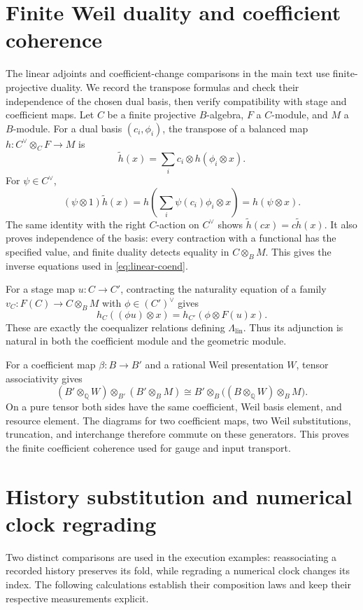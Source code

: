 \documentclass[11pt,a4paper]{article}
\numberwithin{algorithm}{section}
\numberwithin{equation}{section}
\theoremstyle{definition}
\theoremstyle{remark}
\theoremstyle{plain}
\newcommand{\QQ}{\mathbb Q}
\newcommand{\Lamlin}{\Lambda_{\mathrm{lin}}}
\theoremstyle{definition}
\theoremstyle{plain}
\begin{document}
\section{Finite Weil duality and coefficient coherence}
\label{app:weil}

The linear adjoints and coefficient-change comparisons in the
main text use finite-projective duality. We record the transpose
formulas and check their independence of the chosen dual basis,
then verify compatibility with stage and coefficient maps.
Let $C$ be a finite projective $B$-algebra, $F$ a $C$-module,
and $M$ a $B$-module. For a dual basis $(c_i,\phi_i)$,
the transpose of a balanced map
$h:C^\vee\otimes_CF\to M$ is
\[
 \widetilde h(x)=\sum_i c_i\otimes h(\phi_i\otimes x).
\]
For $\psi\in C^\vee$,
\[
 (\psi\otimes1)\widetilde h(x)
 =h\left(\sum_i\psi(c_i)\phi_i\otimes x\right)
 =h(\psi\otimes x).
\]
The same identity with the right $C$-action on $C^\vee$
shows $\widetilde h(cx)=c\widetilde h(x)$.
It also proves independence of the basis: every contraction
with a functional has the specified value, and finite
duality detects equality in $C\otimes_BM$.
This gives the inverse equations used in
\eqref{eq:linear-coend}.

For a stage map $u:C\to C'$, contracting the naturality
equation of a family $v_C:F(C)\to C\otimes_BM$ with
$\phi\in(C')^\vee$ gives
\[
 h_C((\phi u)\otimes x)
 =
 h_{C'}(\phi\otimes F(u)x).
\]
These are exactly the coequalizer relations defining
$\Lamlin$. Thus its adjunction is natural in both the
coefficient module and the geometric module.

For a coefficient map $\beta:B\to B'$ and a rational
Weil presentation $W$, tensor associativity gives
\[
 (B'\otimes_{\QQ}W)\otimes_{B'}(B'\otimes_BM)
 \cong
 B'\otimes_B\bigl((B\otimes_{\QQ}W)\otimes_BM\bigr).
\]
On a pure tensor both sides have the same coefficient,
Weil basis element, and resource element.
The diagrams for two coefficient maps, two Weil
substitutions, truncation, and interchange therefore
commute on these generators. This proves the finite
coefficient coherence used for gauge and input transport.


\section{History substitution and numerical clock regrading}
\label{app:clocks}

Two distinct comparisons are used in the execution examples:
reassociating a recorded history preserves its fold, while
regrading a numerical clock changes its index. The following
calculations establish their composition laws and keep their
respective measurements explicit.
\end{document}
